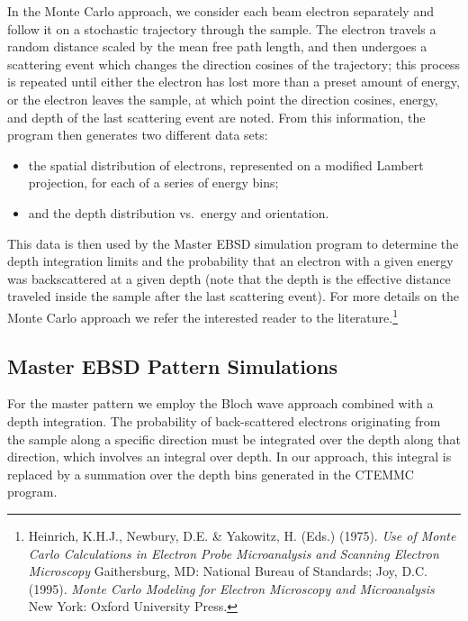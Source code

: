 \documentclass[DIV=calc, paper=letter, fontsize=11pt]{scrartcl}	 %
\begin{document}
In the Monte Carlo approach, we consider each beam electron separately and follow it on a stochastic trajectory 
through the sample.  The electron travels a random distance scaled by the mean free path length, and then undergoes a 
scattering event which changes the direction cosines of the trajectory; this process is repeated until either the electron has
lost more than a preset amount of energy, or the electron leaves the sample, at which point the direction cosines, energy,
and depth of the last scattering event are noted.  From this information, the program then generates two different data sets:
\begin{itemize}
	\item the spatial distribution of electrons, represented on a modified Lambert projection, for each of a series of 
	energy bins;
	\item and the depth distribution vs.\ energy and orientation.
\end{itemize}
This data is then used by the Master EBSD simulation program to determine the depth integration limits and the probability 
that an electron with a given energy was backscattered at a given depth (note that the depth is the effective distance traveled 
inside the sample after the last scattering event).  For more details on the Monte Carlo approach we refer the interested reader to
the literature.\footnote{Heinrich, K.H.J., Newbury, D.E. \& Yakowitz, H. (Eds.) (1975).
\textit{Use of Monte Carlo Calculations in Electron Probe Microanalysis and Scanning Electron Microscopy} Gaithersburg, MD: National Bureau of Standards;
Joy, D.C. (1995). \textit{Monte Carlo Modeling for Electron Microscopy and Microanalysis} New York: Oxford University Press.}

\subsection{Master EBSD Pattern Simulations \label{sec:Master}}
For the master pattern we employ the Bloch wave approach combined with a depth integration.  The probability 
of back-scattered electrons originating from the sample along a specific direction must be integrated over the depth
along that direction, which involves an integral over depth.  In our approach, this integral is replaced by a summation
over the depth bins generated in the \textsf{CTEMMC} program.  
\end{document}
